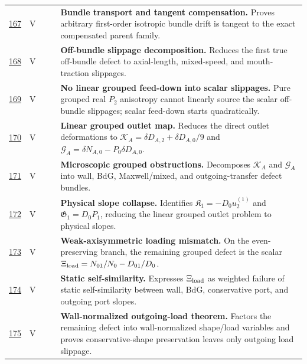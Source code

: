 {\begin{longtable}{@{}L{0.055\textwidth}L{0.075\textwidth}L{0.145\textwidth}L{0.235\textwidth}L{0.43\textwidth}@{}}
\addlinespace
\hyperref[stage:167]{167} & V &  & \StatusExactClosure{} & \textbf{Bundle transport and tangent compensation.} Proves arbitrary first-order isotropic bundle drift is tangent to the exact compensated parent family. \\
\addlinespace
\hyperref[stage:168]{168} & V &  & \StatusExactClosure{} & \textbf{Off-bundle slippage decomposition.} Reduces the first true off-bundle defect to axial-length, mixed-speed, and mouth-traction slippages. \\
\addlinespace
\hyperref[stage:169]{169} & V &  & \StatusExactClosure{} & \textbf{No linear grouped feed-down into scalar slippages.} Pure grouped real \(P_2\) anisotropy cannot linearly source the scalar off-bundle slippages; scalar feed-down starts quadratically. \\
\addlinespace
\hyperref[stage:170]{170} & V &  & \StatusExactClosure{} & \textbf{Linear grouped outlet map.} Reduces the direct outlet deformations to \(\mathcal K_A=\delta D_{A,2}+\delta D_{A,0}/9\) and \(\mathcal G_A=\delta N_{A,0}-P_0\delta D_{A,0}\). \\
\addlinespace
\hyperref[stage:171]{171} & V &  & \StatusExactClosure{} & \textbf{Microscopic grouped obstructions.} Decomposes \(\mathcal K_A\) and \(\mathcal G_A\) into wall, BdG, Maxwell/mixed, and outgoing-transfer defect bundles. \\
\addlinespace
\hyperref[stage:172]{172} & V &  & \StatusExactClosure{} & \textbf{Physical slope collapse.} Identifies \(\mathfrak K_1=-D_0u_2^{(1)}\) and \(\mathfrak G_1=D_0P_1\), reducing the linear grouped outlet problem to physical slopes. \\
\addlinespace
\hyperref[stage:173]{173} & V &  & \StatusExactClosure{} & \textbf{Weak-axisymmetric loading mismatch.} On the even-preserving branch, the remaining grouped defect is the scalar \(\Xi_{\rm load}=N_{01}/N_0-D_{01}/D_0\). \\
\addlinespace
\hyperref[stage:174]{174} & V &  & \StatusExactClosure{} & \textbf{Static self-similarity.} Expresses \(\Xi_{\rm load}\) as weighted failure of static self-similarity between wall, BdG, conservative port, and outgoing port slopes. \\
\addlinespace
\hyperref[stage:175]{175} & V &  & \StatusExactClosure{} & \textbf{Wall-normalized outgoing-load theorem.} Factors the remaining defect into wall-normalized shape/load variables and proves conservative-shape preservation leaves only outgoing load slippage. \\

\end{longtable}}
